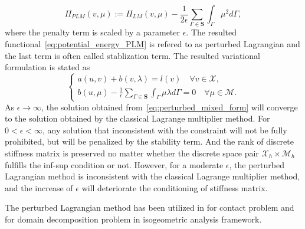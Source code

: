 \documentclass[preprint,12pt]{elsarticle}
\begin{document}
\begin{equation}
    \Pi_{PLM}(v,\mu):=\Pi_{LM}(v,\mu)-\frac{1}{2\epsilon}\sum_{\Gamma\in\mathbf{S}}\int_\Gamma\mu^2d\Gamma,\label{eq:potential_energy_PLM}
\end{equation}
where the penalty term is scaled by a parameter $\epsilon$. The resulted functional~\eqref{eq:potential_energy_PLM} is refered to as perturbed Lagrangian and the last term is often called stablization term. The resulted variational formulation is stated as
\begin{equation}
    \left\{
    \begin{array}{ll}
        a(u,v)+b(v,\lambda)=l(v) \quad \forall v\in{\mathcal{X}},\\
        b(u,\mu) - \frac{1}{\epsilon}\sum_{\Gamma\in\mathbf{S}}\int_\Gamma\mu\lambda{}d\Gamma=0 \quad \forall \mu\in{\mathcal{M}}.\label{eq:perturbed_mixed_form}
    \end{array}
    \right.
\end{equation}
As $\epsilon\rightarrow\infty$, the solution obtained from~\eqref{eq:perturbed_mixed_form} will converge to the solution obtained by the classical Lagrange multiplier method. For $0<\epsilon<{\infty}$, any solution that inconsistent with the constraint will not be fully prohibited, but will be penalized by the stability term. And the rank of discrete stiffness matrix is preserved no matter whether the discrete space pair $\mathcal{X}_h\times{}\mathcal{M}_h$ fulfills the inf-sup condition or not. However, for a moderate $\epsilon$, the perturbed Lagrangian method is inconsistent with the classical Lagrange multiplier method, and the increase of $\epsilon$ will deteriorate the conditioning of stiffness matrix.\par

The perturbed Lagrangian method has been utilized in \cite{simo1985perturbed} for contact problem and \cite{dornisch2011boundary, apostolatos2015domain} for domain decomposition problem in isogeometric analysis framework.
\end{document}
